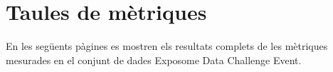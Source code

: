 \documentclass[CAT,BIB]{TFUOC}%
\begin{document}
%
%
%


    \section{Taules de mètriques}

    En les següents pàgines es mostren els resultats complets
    de les mètriques mesurades en el conjunt de dades
    Exposome Data Challenge Event.
\end{document}
